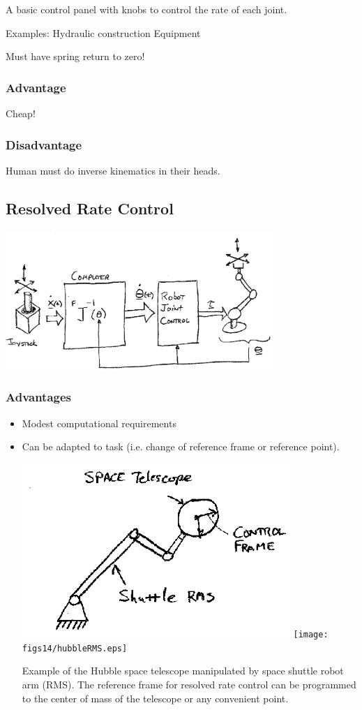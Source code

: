 A basic control panel with knobs to control the rate of each joint.

Examples:   Hydraulic construction Equipment

Must have spring return to zero!

\subsubsection*{Advantage}
Cheap!
\subsubsection*{Disadvantage}
Human must do inverse kinematics in their heads.



\subsection{Resolved Rate Control}

\includegraphics[width=4.0in]{figs14/00399.eps}


\subsubsection*{Advantages}
\begin{itemize}
	\item Modest computational requirements
	\item Can be adapted to task (i.e. change of reference frame or reference point).

	\includegraphics[width=4.0in]{figs14/00400.eps} \texttt{[image: figs14/hubbleRMS.eps]}	%

        Example of the Hubble space telescope manipulated by space shuttle robot arm (RMS).   The reference frame for resolved rate control can be programmed to the center of mass of the telescope or any convenient point. 	%
\end{itemize}


